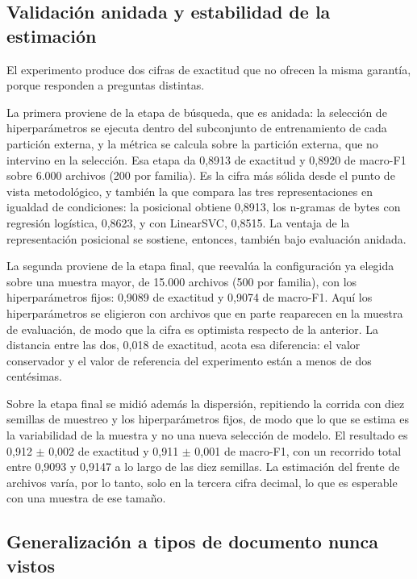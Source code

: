 \subsection{Validación anidada y estabilidad de la estimación}
\label{subsec:exp2c_anidada}

El experimento produce dos cifras de exactitud que no ofrecen la misma garantía, porque responden a preguntas distintas.

La primera proviene de la etapa de búsqueda, que es anidada: la selección de hiperparámetros se ejecuta dentro del subconjunto de entrenamiento de cada partición externa, y la métrica se calcula sobre la partición externa, que no intervino en la selección. Esa etapa da 0,8913 de exactitud y 0,8920 de macro-F1 sobre 6.000 archivos (200 por familia). Es la cifra más sólida desde el punto de vista metodológico, y también la que compara las tres representaciones en igualdad de condiciones: la posicional obtiene 0,8913, los n-gramas de bytes con regresión logística, 0,8623, y con LinearSVC, 0,8515. La ventaja de la representación posicional se sostiene, entonces, también bajo evaluación anidada.

La segunda proviene de la etapa final, que reevalúa la configuración ya elegida sobre una muestra mayor, de 15.000 archivos (500 por familia), con los hiperparámetros fijos: 0,9089 de exactitud y 0,9074 de macro-F1. Aquí los hiperparámetros se eligieron con archivos que en parte reaparecen en la muestra de evaluación, de modo que la cifra es optimista respecto de la anterior. La distancia entre las dos, 0,018 de exactitud, acota esa diferencia: el valor conservador y el valor de referencia del experimento están a menos de dos centésimas.

Sobre la etapa final se midió además la dispersión, repitiendo la corrida con diez semillas de muestreo y los hiperparámetros fijos, de modo que lo que se estima es la variabilidad de la muestra y no una nueva selección de modelo. El resultado es 0,912 $\pm$ 0,002 de exactitud y 0,911 $\pm$ 0,001 de macro-F1, con un recorrido total entre 0,9093 y 0,9147 a lo largo de las diez semillas. La estimación del frente de archivos varía, por lo tanto, solo en la tercera cifra decimal, lo que es esperable con una muestra de ese tamaño.

\subsection{Generalización a tipos de documento nunca vistos}
\label{subsec:exp2c_tipos}


